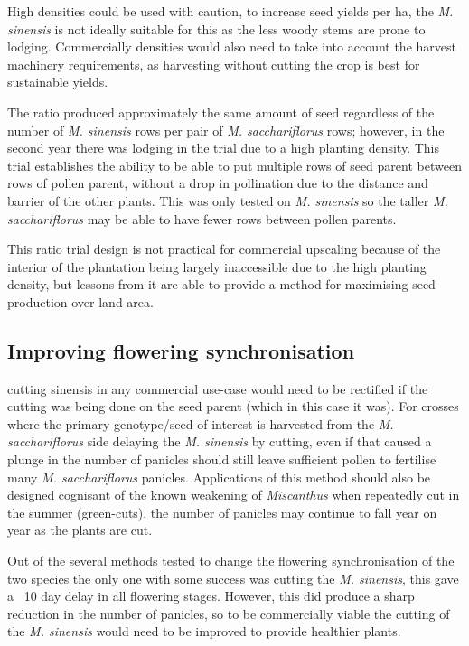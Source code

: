 \documentclass[fleqn, 15pt, lineno]{olplainarticle}
\begin{document}
High densities could be used with caution, to increase seed yields per ha, the \textit{M. sinensis} is not ideally suitable for this as the less woody stems are prone to lodging.
Commercially densities would also need to take into account the harvest machinery requirements, as harvesting without cutting the crop is best for sustainable yields.

The ratio produced approximately the same amount of seed regardless of the number of \textit{M. sinensis} rows per pair of \textit{M. sacchariflorus} rows; however, in the second year there was lodging in the trial due to a high planting density.
This trial establishes the ability to be able to put multiple rows of seed parent between rows of pollen parent, without a drop in pollination due to the distance and barrier of the other plants.
This was only tested on \textit{M. sinensis} so the taller \textit{M. sacchariflorus} may be able to have fewer rows between pollen parents.

This ratio trial design is not practical for commercial upscaling because of the interior of the plantation being largely inaccessible due to the high planting density, but lessons from it are able to provide a method for maximising seed production over land area.


\subsection{Improving flowering synchronisation}

cutting sinensis in any commercial use-case would need to be rectified if the cutting was being done on the seed parent (which in this case it was).
For crosses where the primary genotype/seed of interest is harvested from the \textit{M. sacchariflorus} side delaying the \textit{M. sinensis} by cutting, even if that caused a plunge in the number of panicles should still leave sufficient pollen to fertilise many \textit{M. sacchariflorus} panicles.
Applications of this method should also be designed cognisant of the known weakening of \textit{Miscanthus} when repeatedly cut in the summer (green-cuts), the number of panicles may continue to fall year on year as the plants are cut.

Out of the several methods tested to change the flowering synchronisation of the two species the only one with some success was cutting the \textit{M. sinensis}, this gave a ~10 day delay in all flowering stages.
However, this did produce a sharp reduction in the number of panicles, so to be commercially viable the cutting of the \textit{M. sinensis} would need to be improved to provide healthier plants.
\end{document}
